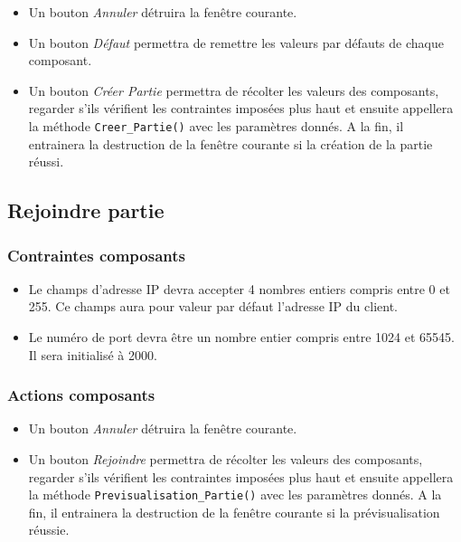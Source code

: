 \begin{itemize}
	\item Un bouton \textit{Annuler} détruira la fenêtre courante.
	\item Un bouton \textit{Défaut} permettra de remettre les valeurs 
          par défauts de chaque composant.
	\item Un bouton \textit{Créer Partie} permettra de récolter les valeurs des 
	      composants, regarder s'ils vérifient les contraintes imposées plus haut
	      et ensuite appellera la méthode \texttt{Creer\_Partie()} avec les 
	      paramètres donnés. A la fin, il entrainera la destruction de la fenêtre
	      courante si la création de la partie réussi.
\end{itemize}

\subsection{Rejoindre partie}

\subsubsection{Contraintes composants}

\begin{itemize}
	\item Le champs d'adresse IP devra accepter 4 nombres entiers compris entre 
	      0 et 255. Ce champs aura pour valeur par défaut l'adresse IP du client.
	\item Le numéro de port devra être un nombre entier compris entre 1024 et 65545.
	      Il sera initialisé à 2000.
\end{itemize}

\subsubsection{Actions composants}

\begin{itemize}
	\item Un bouton \textit{Annuler} détruira la fenêtre courante.
	\item Un bouton \textit{Rejoindre} permettra de récolter les valeurs des 
	      composants, regarder s'ils vérifient les contraintes imposées plus haut
	      et ensuite appellera la méthode \texttt{Previsualisation\_Partie()} avec
	      les paramètres donnés. A la fin, il entrainera la destruction de la 
	      fenêtre courante si la prévisualisation réussie.
\end{itemize}

